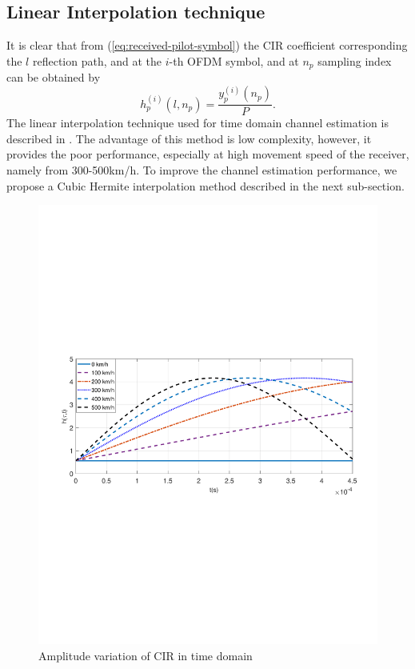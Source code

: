 \documentclass[12pt,journal,draftclsnofoot,onecolumn]{IEEEtran}
\begin{document}
\subsection{Linear Interpolation technique}
It is clear that from (\ref{eq:received-pilot-symbol}) the CIR coefficient corresponding the $l$ reflection path, and at the $i$-th OFDM symbol, and  at $n_p$ sampling index  can be obtained by
%
\begin{equation}\label{eq:CIR-at-pilot}
	h^{(i)}_{p}(l,n_p)= \dfrac{y^{(i)}_{p}(n_p)}{P}.
\end{equation}
%
The linear interpolation technique used for time domain channel estimation is described in \cite{Jeon1999}. The advantage of this method is low complexity, however, it provides the poor performance, especially at high movement speed of the receiver, namely from 300-500km/h. To improve the channel estimation performance, we propose a Cubic Hermite interpolation method described in the next sub-section.
%
	\begin{figure}
		\centering
		\includegraphics[width=1.0\linewidth]{"figures/CIR_variation_speed"}
		\caption{Amplitude variation of CIR  in time domain}
		\label{fig:cir-variation}
	\end{figure}
	
\end{document}
